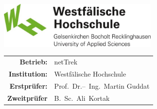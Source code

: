 \begin{titlepage}
    \maketitle
    \vspace*{\fill}
    \begin{flushleft}
        
    \end{flushleft}
    \vspace{1cm}
    \begin{flushright}
        \includegraphics[width={0.6\textwidth}]{../assets/img/logos/whs}
    \end{flushright}
    \vspace*{\fill}
    \begin{large}
        \begin{tabular}{r l}
            \textbf{Betrieb:}     & \acl{netTrek}                  \\
            \textbf{Institution:} & Westfälische Hochschule        \\
            \textbf{Erstprüfer:}  & Prof.~Dr.--~Ing.~Martin Guddat \\
            \textbf{Zweitprüfer}  & B.~Sc.~Ali~Kortak              \\
        \end{tabular}
    \end{large}
\end{titlepage}
